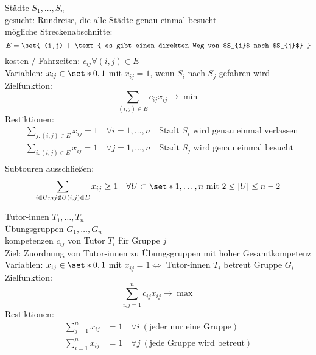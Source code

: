 \begin{beispiel}\enter
	Städte $S_{1},\dots, S_{n}$\\
	gesucht: Rundreise, die alle Städte genau einmal besucht\\
	mögliche Streckenabschnitte:
	\begin{equation*}
		E = \set{  (i,j) | \text{ es gibt einen direkten Weg von $S_{i}$ nach $S_{j}$} }
	\end{equation*}
	kosten / Fahrzeiten: $c_{ij} \forall (i,j) \in E$\\
	Variablen: $x_{ij} \in \set*{0,1}$ mit $x_{ij}=1$, wenn $S_{i}$ nach $S_j$ gefahren wird\\
	Zielfunktion:
	\begin{equation*}
		\sum_{(i,j)\in E}  c_{ij}x_{ij} \rightarrow \min
	\end{equation*}
	Restiktionen:
	\begin{align*}
		&\sum_{j:(i,j)\in E} x_{ij}=1 \quad \forall i = 1,\dots,n\quad \text{Stadt $S_{i}$ wird genau einmal verlassen}\\
		&\sum_{i:(i,j)\in E} x_{ij}=1 \quad \forall j = 1,\dots,n \quad\text{Stadt $S_{j}$ wird genau einmal besucht}\\
	\end{align*}
	Subtouren ausschließen:
	\begin{align*}
		\sum_{i\in Um j \not\in U (i,j) \in E} x_{ij} \geq 1 \quad \forall U \subset \set*{1,\dots,n} \text{ mit }2\leq |U|\leq n-2
	\end{align*}
\end{beispiel}

\begin{beispiel}\enter
	Tutor-innen $T_{1},\dots,T_{n}$ \\
	Übungsgruppen $G_{1},\dots, G_{n}$ \\
	kompetenzen $c_{ij}$ von Tutor $T_{i}$ für Gruppe $j$\\
	Ziel: Zuordnung von Tutor-innen zu Übungsgruppen mit hoher Gesamtkompetenz\\
	Variablen: $x_{ij}\in \set*{0,1}$ mit $x_{ij}=1 \iff$ Tutor-innen $T_{i}$ betreut Gruppe $G_{i}$ \\
	Zielfunktion:
	\begin{equation*}
		\sum_{i,j=1}^{n}  c_{ij}x_{ij} \rightarrow \max
	\end{equation*}
	Restiktionen:
	\begin{align*}
		\sum_{j=1}^{n} x_{ij} &= 1\quad \forall i\ (\text{jeder nur eine Gruppe})\\
		\sum_{i=1}^{n} x_{ij} &= 1\quad \forall j\ (\text{jede Gruppe wird betreut})
	\end{align*}
\end{beispiel}

